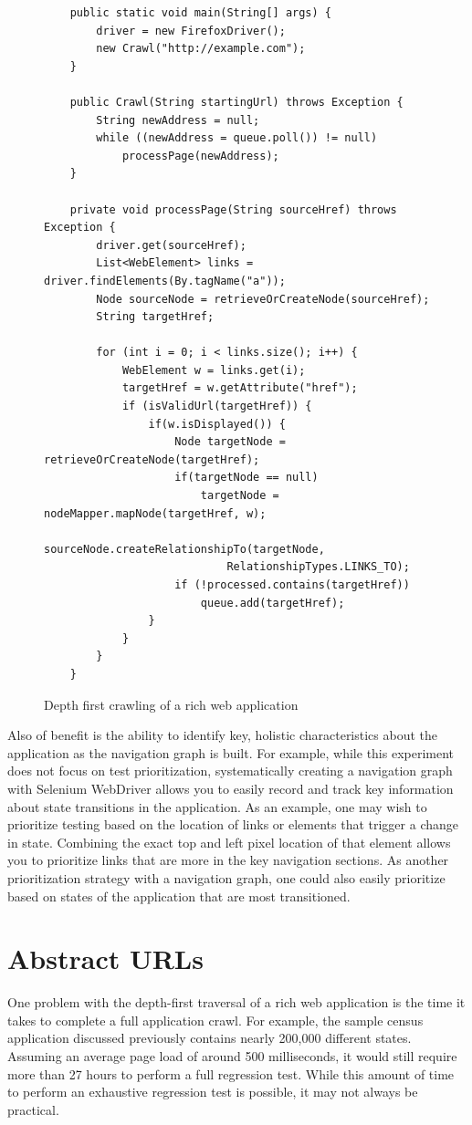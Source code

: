 \begin{figure}
\begin{lstlisting}
	public static void main(String[] args) {
		driver = new FirefoxDriver();
		new Crawl("http://example.com");
	}

	public Crawl(String startingUrl) throws Exception {
		String newAddress = null;
		while ((newAddress = queue.poll()) != null)
			processPage(newAddress);
	}

	private void processPage(String sourceHref) throws Exception {
		driver.get(sourceHref);
		List<WebElement> links = driver.findElements(By.tagName("a"));
		Node sourceNode = retrieveOrCreateNode(sourceHref);
		String targetHref;

		for (int i = 0; i < links.size(); i++) {
			WebElement w = links.get(i);		
			targetHref = w.getAttribute("href");
			if (isValidUrl(targetHref)) {
				if(w.isDisplayed()) {
					Node targetNode = retrieveOrCreateNode(targetHref);				
					if(targetNode == null)
						targetNode = nodeMapper.mapNode(targetHref, w);				
					sourceNode.createRelationshipTo(targetNode, 
							RelationshipTypes.LINKS_TO);
					if (!processed.contains(targetHref))
						queue.add(targetHref);
				}
			}
		}
	}
\end{lstlisting}
\caption{Depth first crawling of a rich web application}
\label{crawlingAlgorithm}
\end{figure}

Also of benefit is the ability to identify key, holistic characteristics about the application as the navigation graph is built.  For example, while this experiment does not focus on test prioritization, systematically creating a navigation graph with Selenium WebDriver allows you to easily record and track key information about state transitions in the application.  As an example, one may wish to prioritize testing based on the location of links or elements that trigger a change in state.  Combining the exact top and left pixel location of that element allows you to prioritize links that are more in the key navigation sections.  As another prioritization strategy with a navigation graph, one could also easily prioritize based on states of the application that are most transitioned.

\section{Abstract URLs}
One problem with the depth-first traversal of a rich web application is the time it takes to complete a full application crawl.  For example, the sample census application discussed previously contains nearly 200,000 different states.  Assuming an average page load of around 500 milliseconds, it would still require more than 27 hours to perform a full regression test.  While this amount of time to perform an exhaustive regression test is possible, it may not always be practical.

